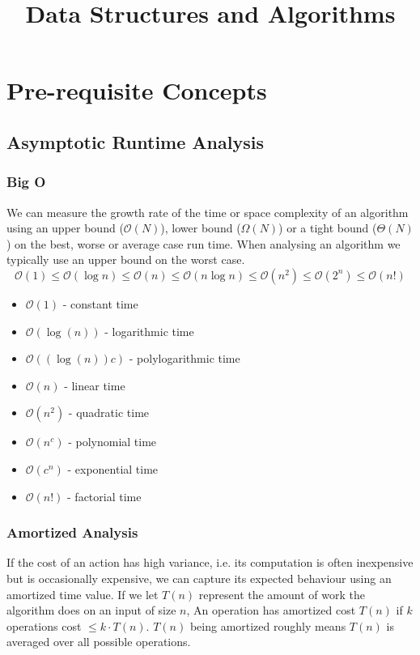 \documentclass{article}
\title{\vspace{-3cm} Data Structures and Algorithms}
\author{}
\date{}
\newcommand{\bigO}{\ensuremath{\mathcal{O}}}
\begin{document}
\maketitle
\vspace{-1.5cm}
\tableofcontents
\newpage

\section{Pre-requisite Concepts}

    \subsection{Asymptotic Runtime Analysis}
    \subsubsection{Big O}
    We can measure the growth rate of the time or space complexity of an algorithm using an upper bound ($\bigO(N)$), lower bound ($\Omega (N) $) or a tight bound ($\Theta (N)$) on the best, worse or average case run time. When analysing an algorithm we typically use an upper bound on the worst case. 
    \[
        \bigO(1) \leq \bigO(\log n) \leq \bigO(n) \leq \bigO(n \log n) \leq \bigO(n^2) \leq  \bigO(2^n)  \leq \bigO(n!)
    \]
    \begin{multicols}{2}
    \begin{itemize}
        \item[] $\bigO(1)$ - constant time
        \item[] $\bigO(\log(n))$ - logarithmic time
        \item[] $\bigO((\log(n))c)$ - polylogarithmic time
        \item[] $\bigO(n)$ - linear time
        \item[] $\bigO(n^2)$ - quadratic time
        \item[] $\bigO(n^c)$ - polynomial time
        \item[] $\bigO(c^n)$ - exponential time
        \item[] $\bigO(n!)$ - factorial time
    \end{itemize}
    \end{multicols}
    
    \subsubsection{Amortized Analysis}
    If the cost of an action has high variance, i.e. its computation is often inexpensive but is occasionally expensive, we can capture its expected behaviour using an amortized time value. If we let $T(n)$ represent the amount of work the algorithm does on an input of size $n$, An operation has amortized cost $T(n)$ if $k$ operations cost $\leq k \cdot T(n)$. $T(n)$ being amortized roughly means $T(n)$ is averaged over all possible operations. 
    
\end{document}
